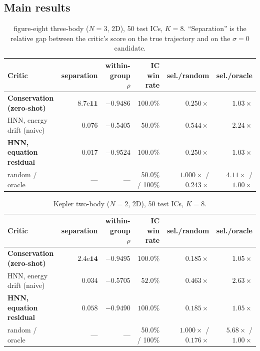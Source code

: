 \documentclass[11pt]{article}
\begin{document}
\subsection{Main results}
\label{sec:main}

\begin{table}[t]
\centering
\footnotesize
\caption{figure-eight three-body ($N=3$, 2D), 50 test ICs, $K=8$. ``Separation'' is the
relative gap between the critic's score on the true trajectory and on the $\sigma=0$
candidate.}
\label{tab:fig8}
\begin{tabular}{lrrrrr}
\toprule
Critic & separation & within-group $\rho$ & IC win rate & sel./random & sel./oracle \\
\midrule
\textbf{Conservation (zero-shot)} & $\mathbf{8.7\mathrm{e}{11}}$ & $-0.9486$ & $\mathbf{100.0\%}$ & $\mathbf{0.250\times}$ & $\mathbf{1.03\times}$ \\
HNN, energy drift (naive) & $0.076$ & $-0.5405$ & $50.0\%$ & $0.544\times$ & $2.24\times$ \\
\textbf{HNN, equation residual} & $0.017$ & $\mathbf{-0.9524}$ & $\mathbf{100.0\%}$ & $\mathbf{0.250\times}$ & $\mathbf{1.03\times}$ \\
\midrule
random / oracle & --- & --- & 50.0\% / 100\% & $1.000\times$ / $0.243\times$ & $4.11\times$ / $1.00\times$ \\
\bottomrule
\end{tabular}
\end{table}

\begin{table}[t]
\centering
\footnotesize
\caption{Kepler two-body ($N=2$, 2D), 50 test ICs, $K=8$.}
\label{tab:kepler}
\begin{tabular}{lrrrrr}
\toprule
Critic & separation & within-group $\rho$ & IC win rate & sel./random & sel./oracle \\
\midrule
\textbf{Conservation (zero-shot)} & $\mathbf{2.4\mathrm{e}{14}}$ & $-0.9495$ & $\mathbf{100.0\%}$ & $\mathbf{0.185\times}$ & $\mathbf{1.05\times}$ \\
HNN, energy drift (naive) & $0.034$ & $-0.5705$ & $52.0\%$ & $0.463\times$ & $2.63\times$ \\
\textbf{HNN, equation residual} & $0.058$ & $\mathbf{-0.9490}$ & $\mathbf{100.0\%}$ & $\mathbf{0.185\times}$ & $\mathbf{1.05\times}$ \\
\midrule
random / oracle & --- & --- & 50.0\% / 100\% & $1.000\times$ / $0.176\times$ & $5.68\times$ / $1.00\times$ \\
\bottomrule
\end{tabular}
\end{table}
\end{document}

